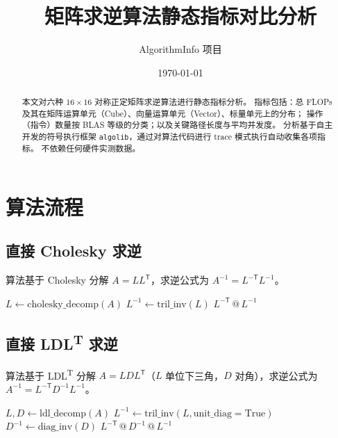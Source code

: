 \documentclass[11pt,a4paper]{ctexart}
\title{\textbf{矩阵求逆算法静态指标对比分析}}
\author{AlgorithmInfo 项目}
\date{\today}
\begin{document}
\maketitle

\begin{abstract}
本文对六种 $16\times16$ 对称正定矩阵求逆算法进行静态指标分析。
指标包括：总 FLOPs 及其在矩阵运算单元（Cube）、向量运算单元（Vector）、标量单元上的分布；
操作（指令）数量按 BLAS 等级的分类；以及关键路径长度与平均并发度。
分析基于自主开发的符号执行框架 \texttt{algolib}，通过对算法代码进行 trace 模式执行自动收集各项指标。
不依赖任何硬件实测数据。
\end{abstract}

\section{算法流程}

\subsection{直接 Cholesky 求逆}

算法基于 Cholesky 分解 $A = LL^{\mathsf T}$，求逆公式为 $A^{-1} = L^{-{\mathsf T}}L^{-1}$。

\begin{algorithm}[H]
\caption{直接 Cholesky 求逆}
\begin{algorithmic}[1]
\State $L \gets \text{cholesky\_decomp}(A)$ 
\State $L^{-1} \gets \text{tril\_inv}(L)$ 
\State \Return $L^{-{\mathsf T}} \! \mathbin{@} L^{-1}$ 
\end{algorithmic}
\end{algorithm}

\subsection{直接 LDL\textsuperscript{T} 求逆}

算法基于 LDL\textsuperscript{T} 分解 $A = LDL^{\mathsf T}$（$L$ 单位下三角，$D$ 对角），求逆公式为 $A^{-1} = L^{-{\mathsf T}} D^{-1} L^{-1}$。

\begin{algorithm}[H]
\caption{直接 LDL\textsuperscript{T} 求逆}
\begin{algorithmic}[1]
\State $L, D \gets \text{ldl\_decomp}(A)$ 
\State $L^{-1} \gets \text{tril\_inv}(L, \text{unit\_diag}{=}\text{True})$
\State $D^{-1} \gets \text{diag\_inv}(D)$ 
\State \Return $L^{-{\mathsf T}} \! \mathbin{@} D^{-1} \! \mathbin{@} L^{-1}$ 
\end{algorithmic}
\end{algorithm}
\end{document}

